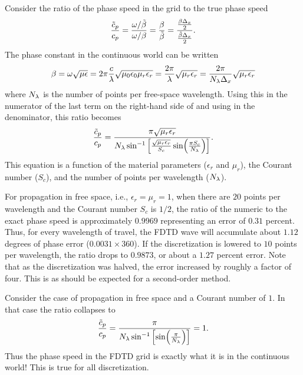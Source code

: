 Consider the ratio of the phase speed in the grid to the true phase
speed
\begin{equation}
  \frac{\tilde{c}_p}{c_p} = 
  \frac{\omega/\tilde{\beta}}{\omega/\beta} = \frac{\beta}{\tilde{\beta}}
  = \frac{\frac{\beta\Delta_x}{2}}{\frac{\tilde{\beta}\Delta_x}{2}}.
  \label{eq:phaseRatio}
\end{equation}
The phase constant in the continuous world can be written
\begin{equation}
  \beta=\omega\sqrt{\mu\epsilon}
  = 2 \pi \frac{c}{\lambda}\sqrt{\mu_0\epsilon_0\mu_r\epsilon_r}
  = \frac{2 \pi}{\lambda}\sqrt{\mu_r\epsilon_r}
  = \frac{2 \pi}{N_\lambda \Delta_x}\sqrt{\mu_r\epsilon_r}
\end{equation}
where $N_\lambda$ is the number of points per free-space wavelength.  Using
this in the numerator of the last term on the right-hand side of
 and using  in the denominator,
this ratio becomes
\begin{equation}
  \frac{\tilde{c}_p}{c_p} = \frac{\pi\sqrt{\mu_r\epsilon_r}}{N_\lambda
  \sin^{-1}\left[\frac{\sqrt{\mu_r\epsilon_r}}{S_c}
  \sin\!\left(\frac{\pi S_c}{N_\lambda}\right)\right]}.
\end{equation}
This equation is a function of the material parameters ($\epsilon_r$
and $\mu_r$), the Courant number ($S_c$), and the number of points per
wavelength ($N_\lambda$).

For propagation in free space, i.e., $\epsilon_r=\mu_r=1$, when there
are $20$ points per wavelength and the Courant number $S_c$ is $1/2$,
the ratio of the numeric to the exact phase speed is approximately
$0.9969$ representing an error of $0.31$ percent.  Thus, for every
wavelength of travel, the FDTD wave will accumulate about $1.12$
degrees of phase error ($0.0031\times 360$).  If the discretization is
lowered to $10$ points per wavelength, the ratio drops to $0.9873$, or
about a $1.27$ percent error.  Note that as the discretization was
halved, the error increased by roughly a factor of four.  This is as
should be expected for a second-order method.

Consider the case of propagation in free space and a Courant number of
$1$.  In that case the ratio collapses to
\begin{equation}
  \frac{\tilde{c}_p}{c_p} = 
  \frac{\pi}{N_\lambda
    \sin^{-1}\left[
    \sin\!\left(\frac{\pi}{N_\lambda}\right)\right]} = 1.
\end{equation}
Thus the phase speed in the FDTD grid is exactly what it is in the
continuous world!  This is true for all discretization.

